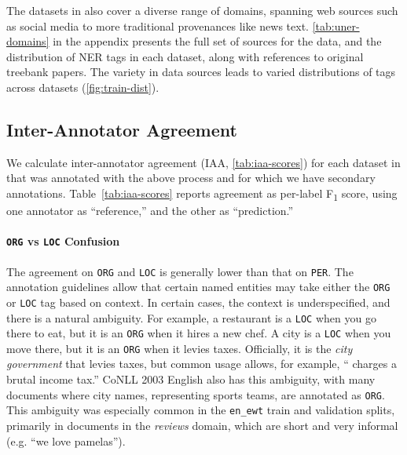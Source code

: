 The datasets in \shortname{} also cover a diverse range of domains, spanning web sources such as social media to more traditional provenances like news text.
\autoref{tab:uner-domains} in the appendix presents the full set of sources for the data, and the distribution of NER tags in each dataset, along with references to original treebank papers.
The variety in data sources leads to varied distributions of tags across datasets (\autoref{fig:train-dist}).


\subsection{Inter-Annotator Agreement}
\label{sec:iaa}
We calculate inter-annotator agreement (IAA, \autoref{tab:iaa-scores}) for each dataset in \shortname{} that was annotated with the above process and for which we have secondary annotations. Table~\ref{tab:iaa-scores} reports agreement as per-label F\textsubscript{1} score, using one annotator as ``reference,'' and the other as ``prediction.''


\paragraph{\texttt{ORG} vs \texttt{LOC} Confusion}
\label{ssec:olconfusion}
The agreement on \texttt{ORG} and \texttt{LOC} is generally lower than that on \texttt{PER}. The annotation guidelines allow that certain named entities may take either the \texttt{ORG} or \texttt{LOC} tag based on context. In certain cases, the context is underspecified, and there is a natural ambiguity. For example, a restaurant is a \texttt{LOC} when you go there to eat, but it is an \texttt{ORG} when it hires a new chef. A city is a \texttt{LOC} when you move there, but it is an \texttt{ORG} when it levies taxes. Officially, it is the \textit{city government} that levies taxes, but common usage allows, for example, `` charges a brutal income tax.'' CoNLL 2003 English also has this ambiguity, with many documents where city names, representing sports teams, are annotated as \texttt{ORG}.
This ambiguity was especially common in the \texttt{en\_ewt} train and validation splits, primarily in documents in the \textit{reviews} domain, which are short and very informal (e.g. ``we love pamelas'').












